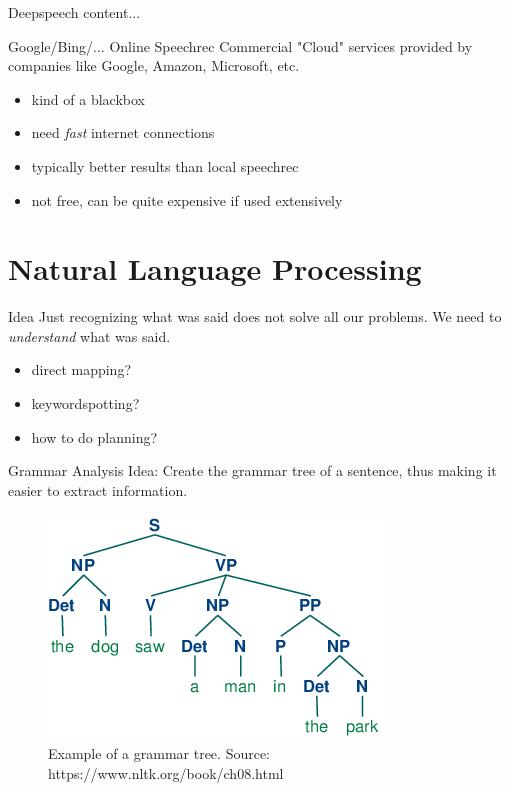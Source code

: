 \documentclass{beamer}
\begin{document}
	\begin{frame}{Deepspeech}
		content...
	\end{frame}
	
	\begin{frame}{Google/Bing/... Online Speechrec}
		Commercial "Cloud" services provided by companies like Google, Amazon, Microsoft, etc.
		\begin{itemize}
			\item kind of a blackbox
			\item need \emph{fast} internet connections
			\item typically better results than local speechrec
			\item not free, can be quite expensive if used extensively
		\end{itemize}
	\end{frame}
	
	\section{Natural Language Processing}%
	
	\begin{frame}{Idea}
		Just recognizing what was said does not solve all our problems. We need to \emph{understand} what was said.
		\pause
		\begin{itemize}
			\item direct mapping?
			\pause
			\item keywordspotting?
			\pause
			\item how to do planning?
		\end{itemize}
	\end{frame}
	
	\begin{frame}{Grammar Analysis}
		Idea: Create the grammar tree of a sentence, thus making it easier to extract information.
		
		\begin{figure}[ht]
			\centering
			\includegraphics[width=.7\linewidth]{Bilder/grammar_tree.png}
			\caption{Example of a grammar tree. Source: https://www.nltk.org/book/ch08.html}
		\end{figure}
		
	\end{frame}
	
\end{document}
